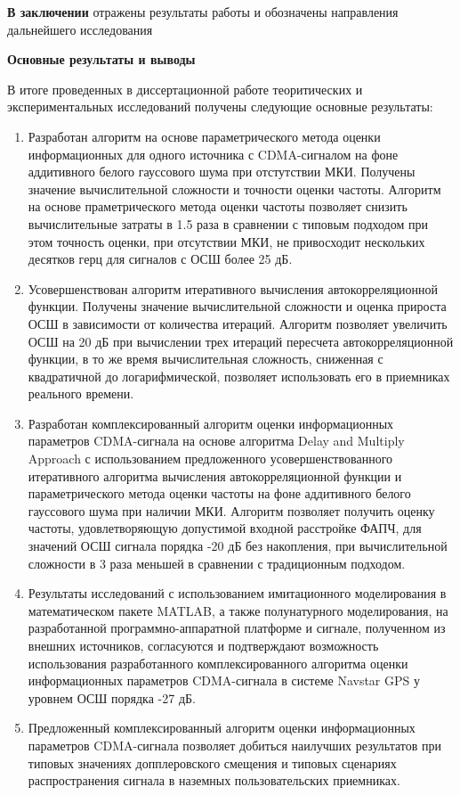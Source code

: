 
{\bf{В заключении}}
отражены результаты работы и обозначены направления дальнейшего исследования

\noindent\centerline{\bf{Основные результаты и выводы}}

В итоге проведенных в диссертационной работе теоритических и экспериментальных исследований получены следующие основные результаты:

\begin{enumerate}
	\item Разработан алгоритм на основе параметрического метода оценки информационных для одного источника с CDMA-сигналом на фоне аддитивного белого гауссового шума при отстутствии МКИ.
		Получены значение вычислительной сложности и точности оценки частоты. Алгоритм на основе праметрического метода оценки частоты позволяет снизить вычислительные
		затраты в 1.5 раза в сравнении с типовым подходом при этом точность оценки, при отсутствии МКИ, не привосходит нескольких десятков герц для сигналов
		с ОСШ более 25 дБ.
	\item Усовершенствован алгоритм итеративного вычисления автокорреляционной функции. Получены значение вычислительной сложности и оценка
		прироста ОСШ в зависимости от количества итераций. Алгоритм позволяет увеличить ОСШ на 20 дБ при вычислении трех итераций
		пересчета автокорреляционной функции, в то же время вычислительная сложность, сниженная с квадратичной до логарифмической,
		позволяет использовать его в приемниках реального времени.
	\item Разработан комплексированный алгоритм оценки информационных параметров CDMA-сигнала на основе алгоритма Delay and Multiply Approach с использованием
		предложенного усовершенствованного итеративного алгоритма вычисления автокорреляционной функции и параметрического
		метода оценки частоты на фоне аддитивного белого гауссового шума при наличии МКИ. Алгоритм позволяет получить оценку частоты, удовлетворяющую
		допустимой входной расстройке ФАПЧ, для значений ОСШ сигнала порядка -20 дБ без накопления, при вычислительной сложности в 3 раза меньшей в сравнении с традиционным подходом.
	\item Результаты исследований с использованием имитационного моделирования в математическом пакете MATLAB, а также полунатурного моделирования,
		на разработанной программно-аппаратной платформе и сигнале, полученном из внешних источников, согласуются и подтверждают возможность
		использования разработанного комплексированного алгоритма оценки информационных параметров CDMA-сигнала в системе Navstar GPS у уровнем ОСШ порядка -27 дБ.
	\item Предложенный комплексированный алгоритм оценки информационных параметров CDMA-сигнала позволяет добиться наилучших результатов при
		типовых значениях допплеровского смещения и типовых сценариях распространения сигнала в наземных пользовательских приемниках.
\end{enumerate}

